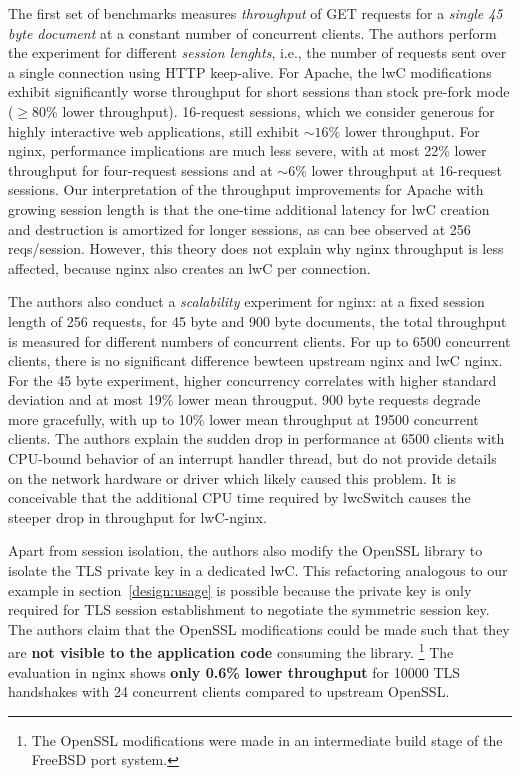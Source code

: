 \documentclass[10pt,twocolumn,letter]{article}
\begin{document}
The first set of benchmarks measures \textit{throughput} of GET requests for a \textit{single 45 byte document} at a constant number of concurrent clients.
The authors perform the experiment for different \textit{session lenghts}, i.e., the number of requests sent over a single connection using HTTP keep-alive.
For Apache, the lwC modifications exhibit significantly worse throughput for short sessions than stock pre-fork mode ($\ge80\%$ lower throughput).
16-request sessions, which we consider generous for highly interactive web applications, still exhibit $\sim 16\%$ lower throughput.
For nginx, performance implications are much less severe, with at most 22\% lower throughput for four-request sessions and at $\sim 6\%$ lower throughput at 16-request sessions.
Our interpretation of the throughput improvements for Apache with growing session length is that the one-time additional latency for lwC creation and destruction is amortized for longer sessions, as can bee observed at 256 reqs/session.
However, this theory does not explain why nginx throughput is less affected, because nginx also creates an lwC per connection.

The authors also conduct a \textit{scalability} experiment for nginx:
at a fixed session length of 256 requests, for 45 byte and 900 byte documents, the total throughput is measured for different numbers  of concurrent clients.
For up to 6500 concurrent clients, there is no significant difference bewteen upstream nginx and lwC nginx.
For the 45 byte experiment, higher concurrency correlates with higher standard deviation and at most 19\% lower mean througput.
900 byte requests degrade more gracefully, with up to 10\% lower mean throughput at \~19500 concurrent clients.
The authors explain the sudden drop in performance at 6500 clients with CPU-bound behavior of an interrupt handler thread, but do not provide details on the network hardware or driver which likely caused this problem.
It is conceivable that the additional CPU time required by lwcSwitch causes the steeper drop in throughput for lwC-nginx.

Apart from session isolation, the authors also modify the OpenSSL library to isolate the TLS private key in a dedicated lwC.
This refactoring analogous to our example in section~\ref{design:usage} is possible because the private key is only required for TLS session establishment to negotiate the symmetric session key.
The authors claim that the OpenSSL modifications could be made such that they are \textbf{not visible to the application code} consuming the library.
\footnote{The OpenSSL modifications were made in an intermediate build stage of the FreeBSD port system.}
The evaluation in nginx shows \textbf{only 0.6\% lower throughput} for 10000 TLS handshakes with 24 concurrent clients compared to upstream OpenSSL.
\end{document}
